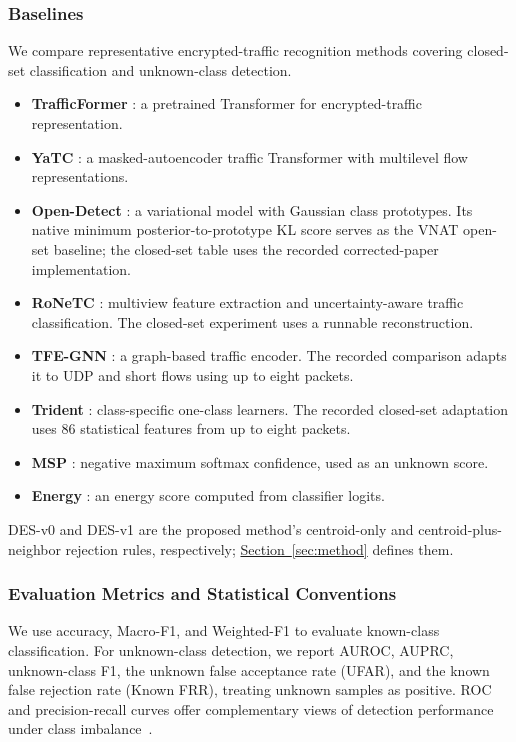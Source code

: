 \subsubsection{Baselines}
We compare representative encrypted-traffic recognition methods covering closed-set classification and unknown-class detection.
\begin{itemize}
\item \textbf{TrafficFormer} : a pretrained Transformer for encrypted-traffic representation.
\item \textbf{YaTC} : a masked-autoencoder traffic Transformer with multilevel flow representations.
\item \textbf{Open-Detect} : a variational model with Gaussian class prototypes. Its native minimum posterior-to-prototype KL score serves as the VNAT open-set baseline; the closed-set table uses the recorded corrected-paper implementation.
\item \textbf{RoNeTC} : multiview feature extraction and uncertainty-aware traffic classification. The closed-set experiment uses a runnable reconstruction.
\item \textbf{TFE-GNN} : a graph-based traffic encoder. The recorded comparison adapts it to UDP and short flows using up to eight packets.
\item \textbf{Trident} : class-specific one-class learners. The recorded closed-set adaptation uses 86 statistical features from up to eight packets.
\item \textbf{MSP} : negative maximum softmax confidence, used as an unknown score.
\item \textbf{Energy} : an energy score computed from classifier logits.
\end{itemize}
DES-v0 and DES-v1 are the proposed method's centroid-only and centroid-plus-neighbor rejection rules, respectively; \hyperref[sec:method]{Section~\ref*{sec:method}} defines them.

\subsubsection{Evaluation Metrics and Statistical Conventions}
We use accuracy, Macro-F1, and Weighted-F1 to evaluate known-class classification. For unknown-class detection, we report AUROC, AUPRC, unknown-class F1, the unknown false acceptance rate (UFAR), and the known false rejection rate (Known FRR), treating unknown samples as positive. ROC and precision-recall curves offer complementary views of detection performance under class imbalance~.

